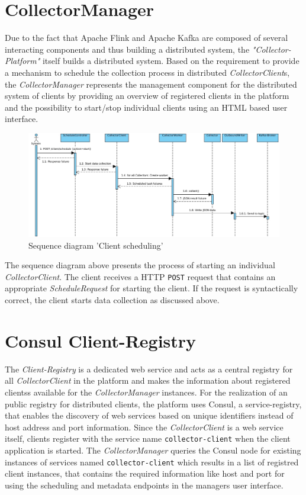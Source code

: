 \section{CollectorManager}
\label{sec:arch-collector-manager}
Due to the fact that Apache Flink and Apache Kafka are composed of several interacting components and thus building
a distributed system, the \textit{"Collector-Platform"} itself builds a distributed system. Based on the requirement to provide a
mechanism to schedule the collection process in distributed \textit{CollectorClient}s, the \textit{CollectorManager} represents the management
component for the distributed system of clients by providing an overview of registered clients in the platform and
the possibility to start/stop individual clients using an HTML based user interface.

\begin{figure}[H]
 	\centering
 	\includegraphics[width=1.0\textwidth]{../uml/sequence-scheduling.jpg}
 	\caption{Sequence diagram 'Client scheduling'}
 	\label{fig:sequence-client-scheduling}
 \end{figure}

The sequence diagram above presents the process of starting an individual \textit{CollectorClient}. The client receives a HTTP
\verb|POST| request that contains an appropriate \textit{ScheduleRequest} for starting the client. If the request is syntactically
correct, the client starts data collection as discussed above.

\section{Consul Client-Registry}

The \textit{Client-Registry} is a dedicated web service and acts as a central registry for all \textit{CollectorClient}
in the platform and makes the information about registered clientss available for the \textit{CollectorManager} instances.
For the realization of an public registry for distributed clients, the platform uses Consul, a service-registry, that enables the discovery
of web services based on unique identifiers instead of host address and port information. Since the \textit{CollectorClient} is a web service itself,
clients register with the service name \verb|collector-client| when the client application is started. The \textit{CollectorManager}
queries the Consul node for existing instances of services named \verb|collector-client| which results in a list of registred client instances,
that contains the required information like host and port for using the scheduling and metadata endpoints in the managers user interface.


